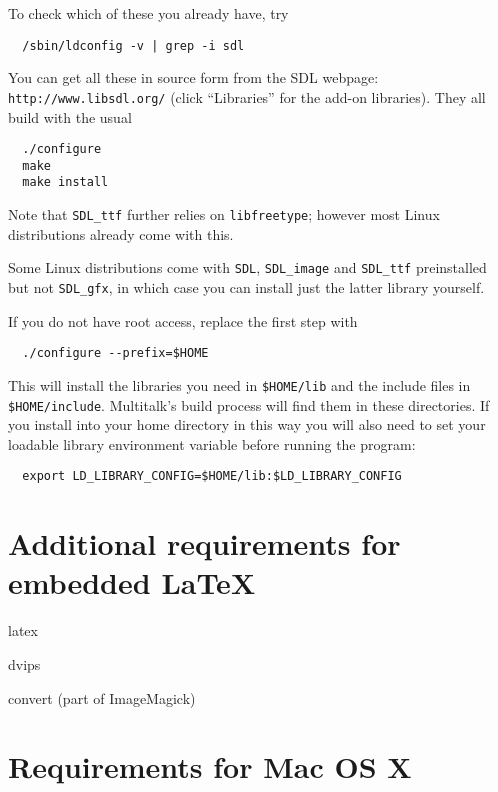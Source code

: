 \documentclass[12pt,a4paper,twoside]{article}
\renewcommand{\_}{\texttt{\symbol{95}}}
\begin{document}
To check which of these you already have, try

\begin{verbatim}
  /sbin/ldconfig -v | grep -i sdl
\end{verbatim}

You can get all these in source form from the SDL webpage:
\verb^http://www.libsdl.org/^ (click ``Libraries'' for the add-on libraries).
They all build with the usual

\begin{verbatim}
  ./configure
  make
  make install
\end{verbatim}

Note that \verb^SDL_ttf^ further relies on \verb^libfreetype^;
however most Linux distributions already come with this.

Some Linux distributions come with \verb^SDL^, \verb^SDL_image^ and
\verb^SDL_ttf^ preinstalled but not \verb^SDL_gfx^, in which case you
can install just the latter library yourself.

If you do not have root access, replace the first step with

\begin{verbatim}
  ./configure --prefix=$HOME
\end{verbatim}

This will install the libraries you need in \verb^$HOME/lib^ and the
include files in \verb^$HOME/include^. Multitalk's build process
will find them in these directories. If you install into your
home directory in this way you will also need to set your
loadable library environment variable before running the program:

\begin{verbatim}
  export LD_LIBRARY_CONFIG=$HOME/lib:$LD_LIBRARY_CONFIG
\end{verbatim}

\section{Additional requirements for embedded LaTeX}

\begin{bulletlist}
\item latex
\item dvips
\item convert (part of ImageMagick)
\end{bulletlist}

\section{Requirements for Mac OS X}
\end{document}
